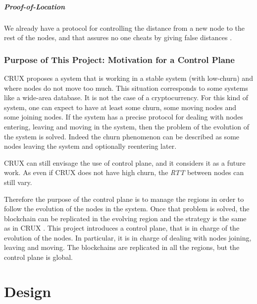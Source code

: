 \documentclass[a4paper,11pt,twoside,openright]{report}
\begin{document}
\paragraph{Proof-of-Location} We already have a protocol for controlling the
distance from a new node to the rest of the nodes, and that assures no one
cheats by giving false distances \cite{Kall2019}. 


\subsection{Purpose of This Project: Motivation for a Control Plane}

CRUX \cite{Basescu2014} proposes a system that is working in a stable system
(with low-churn) and where nodes do not move too much. This situation
corresponds to some systems like a wide-area database. It is not
the case of a cryptocurrency. For this kind of system, one can expect to have
at least some churn, some moving nodes and some joining nodes. If the
system has a precise protocol for dealing with nodes entering, leaving and
moving in the system, then the problem of the evolution of the system is
solved. Indeed the churn phenomenon can be described as some nodes leaving the
system and optionally reentering later. 

CRUX \cite{Basescu2014} can still envisage the use of control plane, and it considers it as a future work. As even if CRUX  \cite{Basescu2014} does not have high churn, the \textit{RTT} between nodes can still vary. 

Therefore the purpose of the control plane is to manage the regions in order to follow the evolution of the nodes in the system. Once that
problem is solved, the blockchain can be replicated in the evolving region and
the strategy is the same as in CRUX \cite{Basescu2014}. This project
introduces a control plane, that is in charge of the evolution of the nodes. In
particular, it is in charge of dealing with nodes joining, leaving and
moving. The blockchains are replicated in all the regions, but the control
plane is global. 

\chapter{Design} \label{chap:Design} %
\end{document}
